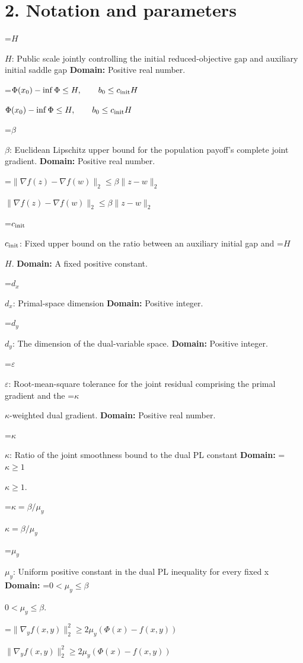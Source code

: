 \documentclass[10pt,a4paper]{article}
\newcommand{\AtlasMath}[1]{\par\begingroup\centering\setbox0=\hbox{$\displaystyle #1$}\ifdim\wd0>1.4\linewidth\typeout{ATLAS WIDE FORMULA: \the\wd0}\fi\ifdim\wd0>\linewidth\resizebox{\linewidth}{!}{\box0}\else\box0\fi\par\endgroup}
\newcommand{\AtlasInlineMath}[1]{\begingroup\setbox0=\hbox{$#1$}\ifdim\wd0>.4\linewidth\endgroup\AtlasMath{#1}\else\endgroup$#1$\fi}
\begin{document}
\section{2. Notation and parameters}


\AtlasInlineMath{H}: Public scale jointly controlling the initial reduced-objective gap and auxiliary initial saddle gap \textbf{Domain:} Positive real number.



\AtlasInlineMath{\Phi(x_0)-\inf\Phi\le H,\qquad b_0\le c_{\rm init}H}



\AtlasInlineMath{\beta}: Euclidean Lipschitz upper bound for the population payoff's complete joint gradient. \textbf{Domain:} Positive real number.



\AtlasInlineMath{\|\nabla f(z)-\nabla f(w)\|_2\le\beta\|z-w\|_2}



\AtlasInlineMath{c_{\rm init}}: Fixed upper bound on the ratio between an auxiliary initial gap and \AtlasInlineMath{H}. \textbf{Domain:} A fixed positive constant.



\AtlasInlineMath{d_x}: Primal-space dimension \textbf{Domain:} Positive integer.



\AtlasInlineMath{d_y}: The dimension of the dual-variable space. \textbf{Domain:} Positive integer.



\AtlasInlineMath{\varepsilon}: Root-mean-square tolerance for the joint residual comprising the primal gradient and the \AtlasInlineMath{\kappa}-weighted dual gradient. \textbf{Domain:} Positive real number.



\AtlasInlineMath{\kappa}: Ratio of the joint smoothness bound to the dual PL constant \textbf{Domain:} \AtlasInlineMath{\kappa\ge1}.



\AtlasInlineMath{\kappa=\beta/\mu_y}



\AtlasInlineMath{\mu_y}: Uniform positive constant in the dual PL inequality for every fixed x \textbf{Domain:} \AtlasInlineMath{0<\mu_y\le\beta}.



\AtlasInlineMath{\|\nabla_yf(x,y)\|_2^2\ge2\mu_y(\Phi(x)-f(x,y))}
\end{document}

